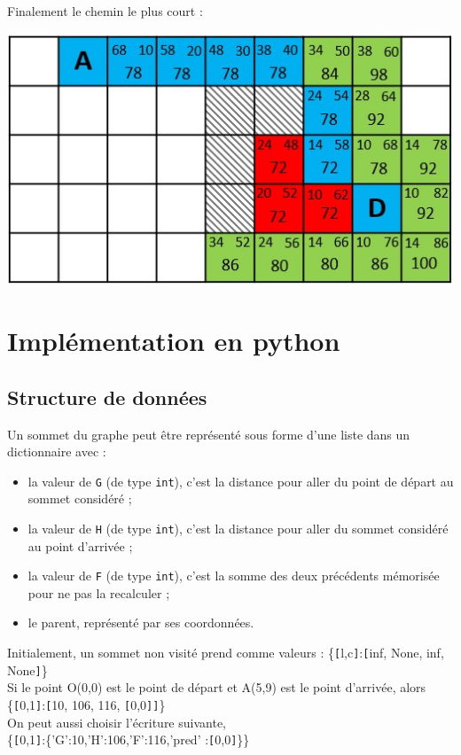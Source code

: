 Finalement le chemin le plus court :
\begin{center}
\includegraphics[scale=0.8]{images/quadrifinal.jpg}
\end{center}

\section{Implémentation en python}

\subsection{Structure de données}

Un sommet du graphe peut être représenté sous forme d'une liste dans un dictionnaire avec :
\begin{itemize}
\item la valeur de \texttt{G} (de type \texttt{int}), c'est la distance pour aller du point de départ au sommet considéré ;
\item la valeur de \texttt{H} (de type \texttt{int}), c'est la distance pour aller du sommet considéré au point d'arrivée ;
\item la valeur de \texttt{F} (de type \texttt{int}), c'est la somme des deux précédents mémorisée pour ne pas la recalculer ;
\item le parent, représenté par ses coordonnées.
\end{itemize}

Initialement, un sommet non visité prend comme valeurs :
\{\verb![!l,c\verb!]!:\verb![!inf, None, inf, None\verb!]!\}\\
Si le point O(0,0) est le point de départ et A(5,9) est le point d'arrivée, alors\\
\{\verb![!0,1\verb!]!:\verb![!10, 106, 116, \verb![!0,0\verb!]!\verb!]!\}\\
On peut aussi choisir l'écriture suivante,\\
\{\verb![!0,1\verb!]!:\{'G':10,'H':106,'F':116,'pred' :\verb![!0,0\verb!]!\}\}


